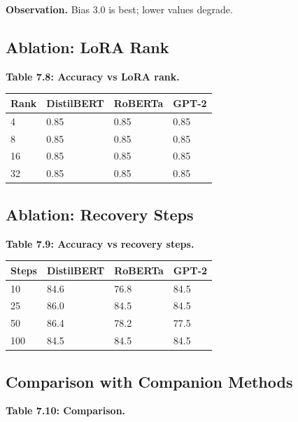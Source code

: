 \textbf{Observation.} Bias 3.0 is best; lower values degrade.

\subsection{Ablation: LoRA Rank}

\textbf{Table 7.8: Accuracy vs LoRA rank.}

\begin{table}[H]
\centering
\small
\begin{tabular}{llll}
\toprule
\textbf{Rank} & \textbf{DistilBERT} & \textbf{RoBERTa} & \textbf{GPT-2} \\
\midrule
4 & 0.85 & 0.85 & 0.85 \\
8 & 0.85 & 0.85 & 0.85 \\
16 & 0.85 & 0.85 & 0.85 \\
32 & 0.85 & 0.85 & 0.85 \\
\bottomrule
\end{tabular}
\end{table}

\subsection{Ablation: Recovery Steps}

\textbf{Table 7.9: Accuracy vs recovery steps.}

\begin{table}[H]
\centering
\small
\begin{tabular}{llll}
\toprule
\textbf{Steps} & \textbf{DistilBERT} & \textbf{RoBERTa} & \textbf{GPT-2} \\
\midrule
10 & 84.6 & 76.8 & 84.5 \\
25 & 86.0 & 84.5 & 84.5 \\
50 & 86.4 & 78.2 & 77.5 \\
100 & 84.5 & 84.5 & 84.5 \\
\bottomrule
\end{tabular}
\end{table}

\subsection{Comparison with Companion Methods}

\textbf{Table 7.10: Comparison.}

